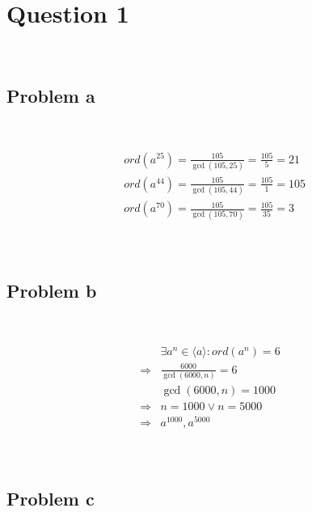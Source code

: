 \documentclass{article}
\begin{document}
\section*{Question 1}

~   

\subsection*{Problem a}

~

\begin{equation*}
    \begin{split}
        &ord(a^{25})=\frac{105}{\gcd(105,25)}=\frac{105}{5}=21\\
        &ord(a^{44})=\frac{105}{\gcd(105,44)}=\frac{105}{1}=105\\
        &ord(a^{70})=\frac{105}{\gcd(105,70)}=\frac{105}{35}=3\\
    \end{split}
\end{equation*}

~

\subsection*{Problem b}

~

\begin{equation*}
    \begin{split}
        &\exists a^n\in\langle a\rangle:ord(a^n)=6\\
        \Rightarrow&\frac{6000}{\gcd(6000,n)}=6\\
        &\gcd(6000,n)=1000\\
        \Rightarrow&n=1000\lor n=5000\\
        \Rightarrow&a^{1000},a^{5000}\\
    \end{split}
\end{equation*}

~

\subsection*{Problem c}

~
\end{document}
